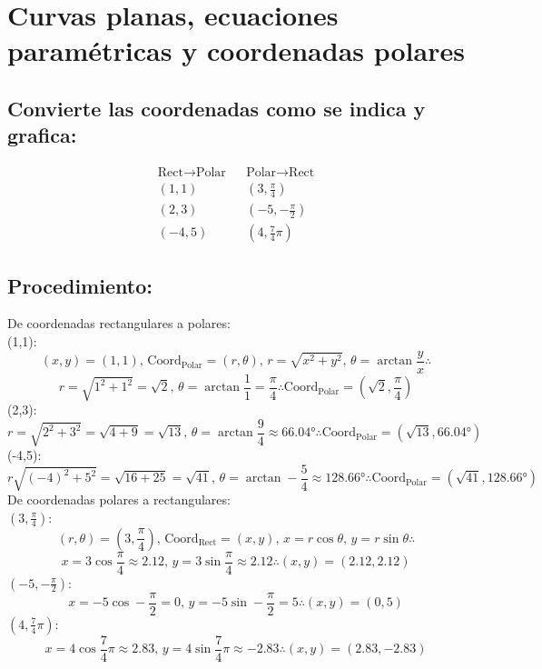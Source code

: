 \documentclass[letterpaper, 12pt]{article}
\begin{document}
\setcounter{page}{1}
\thispagestyle{fancy}
\section*{Curvas planas, ecuaciones paramétricas y coordenadas polares}
\subsection*{Convierte las coordenadas como se indica y grafica:}
\[\begin{matrix}
    \text{Rect}\rightarrow\text{Polar}& &\text{Polar}\rightarrow\text{Rect}\\
    (1,1)&&\left(3,\frac{\pi}{4}\right)\\
    (2,3)&&\left(-5,-\frac{\pi}{2}\right)\\
    (-4,5)&&\left(4,\frac{7}{4}\pi\right)
\end{matrix}\]
\subsection*{Procedimiento:}
\justify
De coordenadas rectangulares a polares:\\
\newline
(1,1):\\
\[(x,y)=(1,1),\, \text{Coord}_{\text{Polar}}=(r,\theta), \, r=\sqrt{x^2+y^2}, \, \theta=\arctan\frac{y}{x}\therefore\]
\[r=\sqrt{1^2+1^2}=\sqrt{2},\, \theta=\arctan\frac{1}{1}=\frac{\pi}{4}\therefore \text{Coord}_{\text{Polar}}=\left(\sqrt{2},\frac{\pi}{4}\right)\]
(2,3):\\
\[r=\sqrt{2^2+3^2}=\sqrt{4+9}=\sqrt{13},\,\theta=\arctan\frac{9}{4}\approx66.04\text{°}\therefore\text{Coord}_{\text{Polar}}=(\sqrt{13},66.04\text{°})\]
(-4,5):\\
\[r\sqrt{(-4)^2+5^2}=\sqrt{16+25}=\sqrt{41},\,\theta=\arctan-\frac{5}{4}\approx128.66\text{°}\therefore\text{Coord}_{\text{Polar}}=(\sqrt{41},128.66\text{°})\]
De coordenadas polares a rectangulares:\\
\newline
\(\left(3,\frac{\pi}{4}\right)\):
\\ 
\[(r,\theta)=\left(3,\frac{\pi}{4}\right),\, \text{Coord}_{\text{Rect}}=(x,y),\, x=r\cos\theta,\, y=r\sin\theta\therefore\]
\[x=3\cos\frac{\pi}{4}\approx2.12,\,y=3\sin\frac{\pi}{4}\approx 2.12\therefore(x,y)=(2.12,2.12)\]
\(\left(-5,-\frac{\pi}{2}\right)\):
\\
\[x=-5\cos-\frac{\pi}{2}=0,\,y=-5\sin-\frac{\pi}{2}=5\therefore(x,y)=(0,5)\]
\(\left(4,\frac{7}{4}\pi\right)\):
\\
\[x=4\cos\frac{7}{4}\pi\approx2.83,\,y=4\sin\frac{7}{4}\pi\approx-2.83\therefore(x,y)=(2.83,-2.83)\]
\end{document}
